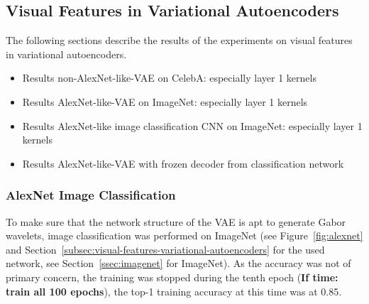 \documentclass[11pt]{article}
\begin{document}
    \subsection{Visual Features in Variational Autoencoders}\label{subsec:results_visual_features_in_variational_autoencoders}
    The following sections describe the results of the experiments on visual features in variational autoencoders.

    \begin{itemize}
        \item Results non-AlexNet-like-VAE on CelebA: especially layer 1 kernels
        \item Results AlexNet-like-VAE on ImageNet: especially layer 1 kernels
        \item Results AlexNet-like image classification CNN on ImageNet: especially layer 1 kernels
        \item Results AlexNet-like-VAE with frozen decoder from classification network
    \end{itemize}

    \subsubsection{AlexNet Image Classification}
    To make sure that the network structure of the \ac{VAE} is apt to generate Gabor wavelets, image classification was performed on ImageNet (see Figure~\ref{fig:alexnet} and Section~\ref{subsec:visual-features-variational-autoencoders} for the used network, see Section~\ref{ssec:imagenet} for ImageNet).
    As the accuracy was not of primary concern, the training was stopped during the tenth epoch (\textbf{If time: train all 100 epochs}), the top-1 training accuracy at this time was at 0.85.
\end{document}
